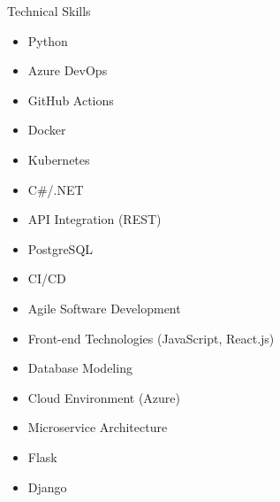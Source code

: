 \begin{rSection}{Technical Skills}
\begin{multicols}{2}
\begin{itemize}[leftmargin=*,nosep]
\item Python
\item Azure DevOps
\item GitHub Actions
\item Docker
\item Kubernetes
\item C\#/.NET
\item API Integration (REST)
\item PostgreSQL
\item CI/CD
\item Agile Software Development
\item Front-end Technologies (JavaScript, React.js)
\item Database Modeling
\item Cloud Environment (Azure)
\item Microservice Architecture
\item Flask
\item Django
\end{itemize}
\end{multicols}
\end{rSection}